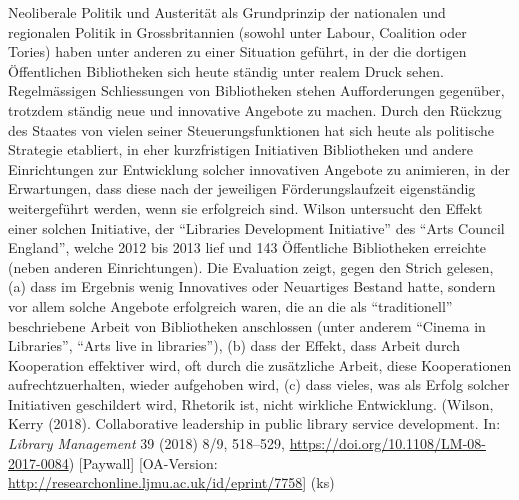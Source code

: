 \documentclass[a4paper,
fontsize=11pt,
oneside,
numbers=noperiodatend,
parskip=half-,
bibliography=totoc,
final
]{scrartcl}
\begin{document}
Neoliberale Politik und Austerität als Grundprinzip der nationalen und
regionalen Politik in Grossbritannien (sowohl unter Labour, Coalition
oder Tories) haben unter anderen zu einer Situation geführt, in der die
dortigen Öffentlichen Bibliotheken sich heute ständig unter realem Druck
sehen. Regelmässigen Schliessungen von Bibliotheken stehen
Aufforderungen gegenüber, trotzdem ständig neue und innovative Angebote
zu machen. Durch den Rückzug des Staates von vielen seiner
Steuerungsfunktionen hat sich heute als politische Strategie etabliert,
in eher kurzfristigen Initiativen Bibliotheken und andere Einrichtungen
zur Entwicklung solcher innovativen Angebote zu animieren, in der
Erwartungen, dass diese nach der jeweiligen Förderungslaufzeit
eigenständig weitergeführt werden, wenn sie erfolgreich sind. Wilson
untersucht den Effekt einer solchen Initiative, der \enquote{Libraries
Development Initiative} des \enquote{Arts Council England}, welche 2012
bis 2013 lief und 143 Öffentliche Bibliotheken erreichte (neben anderen
Einrichtungen). Die Evaluation zeigt, gegen den Strich gelesen, (a) dass
im Ergebnis wenig Innovatives oder Neuartiges Bestand hatte, sondern vor
allem solche Angebote erfolgreich waren, die an die als
\enquote{traditionell} beschriebene Arbeit von Bibliotheken anschlossen
(unter anderem \enquote{Cinema in Libraries}, \enquote{Arts live in
libraries}), (b) dass der Effekt, dass Arbeit durch Kooperation
effektiver wird, oft durch die zusätzliche Arbeit, diese Kooperationen
aufrechtzuerhalten, wieder aufgehoben wird, (c) dass vieles, was als
Erfolg solcher Initiativen geschildert wird, Rhetorik ist, nicht
wirkliche Entwicklung. (Wilson, Kerry (2018). Collaborative leadership
in public library service development. In: \emph{Library Management} 39
(2018) 8/9, 518--529, \url{https://doi.org/10.1108/LM-08-2017-0084})
{[}Paywall{]} {[}OA-Version:
\url{http://researchonline.ljmu.ac.uk/id/eprint/7758}{]} (ks)
\end{document}
